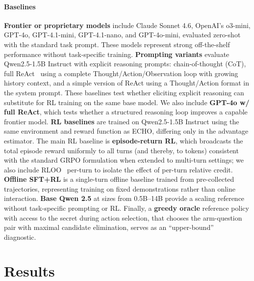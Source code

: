 \documentclass[11pt]{article}
\theoremstyle{plain}
\theoremstyle{definition}
\theoremstyle{remark}
\begin{document}
\paragraph{Baselines}
\textbf{Frontier or proprietary models} include Claude Sonnet 4.6, OpenAI's o3-mini, GPT-4o, GPT-4.1-mini, GPT-4.1-nano, and GPT-4o-mini, evaluated zero-shot with the standard task prompt. These models represent strong off-the-shelf performance without task-specific training. \textbf{Prompting variants} evaluate Qwen2.5-1.5B Instruct with explicit reasoning prompts: chain-of-thought (CoT), full ReAct~\citep{yao2022react} using a complete Thought/Action/Observation loop with growing history context, and a simple version of ReAct using a Thought/Action format in the system prompt. These baselines test whether eliciting explicit reasoning can substitute for RL training on the same base model. We also include \textbf{GPT-4o w/ full ReAct}, which tests whether a structured reasoning loop improves a capable frontier model. \textbf{RL baselines} are trained on Qwen2.5-1.5B Instruct using the same environment and reward function as \textsc{ECHO}, differing only in the advantage estimator. The main RL baseline is \textbf{episode-return RL}, which broadcasts the total episode reward uniformly to all turns (and thereby, to tokens) consistent with the standard GRPO formulation when extended to multi-turn settings; we also include RLOO~\citep{ahmadian-etal-2024-back} per-turn to isolate the effect of per-turn relative credit. \textbf{Offline SFT+RL} is a single-turn offline baseline trained from pre-collected trajectories, representing training on fixed demonstrations rather than online interaction. \textbf{Base Qwen 2.5} at sizes from 0.5B--14B provide a scaling reference without task-specific prompting or RL.  Finally, a \textbf{greedy oracle} reference policy with access to the secret during action selection, that chooses the arm-question pair with maximal candidate elimination, serves as an “upper-bound”~\citep{analyzingnas} diagnostic.%

 

\vspace*{-3mm}
\section{Results}
\label{sec:results}


\vspace*{-3mm}
\end{document}
